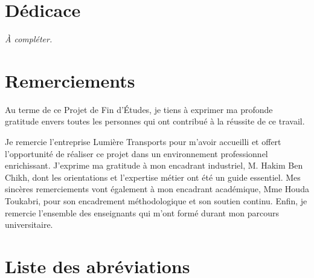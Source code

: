 \documentclass[12pt,a4paper,oneside]{report}
\begin{document}
\setcounter{page}{1}

\chapter*{Dédicace}
\vspace{1cm}
\textit{À compléter.}

\chapter*{Remerciements}

Au terme de ce Projet de Fin d'Études, je tiens à exprimer ma profonde gratitude envers toutes les personnes qui ont contribué à la réussite de ce travail.

Je remercie l'entreprise Lumière Transports pour m'avoir accueilli et offert l'opportunité de réaliser ce projet dans un environnement professionnel enrichissant. J'exprime ma gratitude à mon encadrant industriel, M. Hakim Ben Chikh, dont les orientations et l'expertise métier ont été un guide essentiel. Mes sincères remerciements vont également à mon encadrant académique, Mme Houda Toukabri, pour son encadrement méthodologique et son soutien continu. Enfin, je remercie l'ensemble des enseignants qui m'ont formé durant mon parcours universitaire.

\clearpage
\tableofcontents
\clearpage

\listoffigures
{}
\clearpage

\listoftables
{}
\clearpage

\chapter*{Liste des abréviations}
\end{document}
